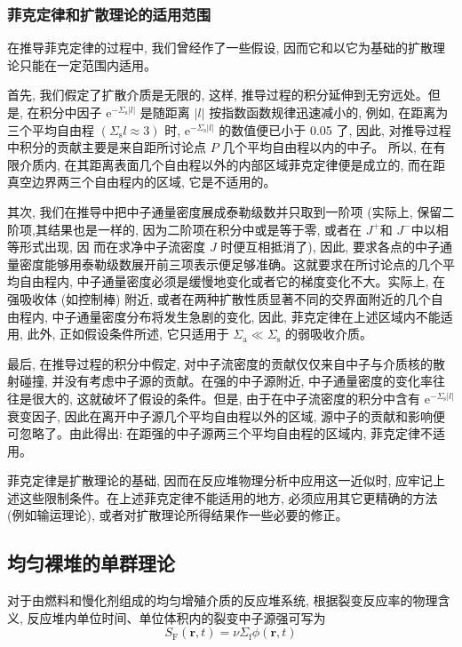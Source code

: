 \documentclass{Sichuan Normal University}
\begin{document}
\subsubsection*{菲克定律和扩散理论的适用范围} 

在推导菲克定律的过程中, 我们曾经作了一些假设, 因而它和以它为基础的扩散理论只能在一定范围内适用。

首先, 我们假定了扩散介质是无限的, 这样, 推导过程的积分延伸到无穷远处。但是, 在积分中因子 $\mathrm{e}^{-\Sigma_{\mathrm{s}}|l|}$ 是随距离 $|l|$ 按指数函数规律迅速减小的, 例如, 在距离为三个平均自由程 $\left(\Sigma_{\mathrm{s}} l \approx 3\right)$ 时, $\mathrm{e}^{-\Sigma_{\mathrm{s}}|l|}$ 的数值便已小于 0.05 了, 因此, 对推导过程中积分的贡献主要是来自距所讨论点 $P$ 几个平均自由程以内的中子。
所以, 在有限介质内, 在其距离表面几个自由程以外的内部区域菲克定律便是成立的, 而在距真空边界两三个自由程内的区域, 它是不适用的。

其次, 我们在推导中把中子通量密度展成泰勒级数并只取到一阶项 (实际上, 保留二阶项,其结果也是一样的, 因为二阶项在积分中或是等于零, 或者在 $J^{+}$和 $J^{-}$中以相等形式出现, 因
而在求净中子流密度 $J$ 时便互相抵消了), 因此, 要求各点的中子通量密度能够用泰勒级数展开前三项表示便足够准确。这就要求在所讨论点的几个平均自由程内, 中子通量密度必须是缓慢地变化或者它的梯度变化不大。实际上, 在强吸收体 (如控制棒) 附近, 或者在两种扩散性质显著不同的交界面附近的几个自由程内, 中子通量密度分布将发生急剧的变化, 因此, 菲克定律在上述区域内不能适用, 此外, 正如假设条件所述, 它只适用于 $\Sigma_{\mathrm{a}} \ll \Sigma_{\mathrm{s}}$ 的弱吸收介质。

最后, 在推导过程的积分中假定, 对中子流密度的贡献仅仅来自中子与介质核的散射碰撞, 并没有考虑中子源的贡献。在强的中子源附近, 中子通量密度的变化率往往是很大的, 这就破坏了假设的条件。但是, 由于在中子流密度的积分中含有 $\mathrm{e}^{-\Sigma_{\mathrm{s}}|l|}$ 衰变因子, 因此在离开中子源几个平均自由程以外的区域, 源中子的贡献和影响便可忽略了。由此得出: 在距强的中子源两三个平均自由程的区域内, 菲克定律不适用。

菲克定律是扩散理论的基础, 因而在反应堆物理分析中应用这一近似时, 应牢记上述这些限制条件。在上述菲克定律不能适用的地方, 必须应用其它更精确的方法 (例如输运理论), 或者对扩散理论所得结果作一些必要的修正。

\subsection{均匀裸堆的单群理论}
对于由燃料和慢化剂组成的均匀增殖介质的反应堆系统, 根据裂变反应率的物理含义, 反应堆内单位时间、单位体积内的裂变中子源强可写为
\begin{equation}
S_{\mathrm{F}}(\boldsymbol{r}, t)=\nu \Sigma_{\mathrm{f}} \phi(\boldsymbol{r}, t)
\end{equation}
\end{document}

